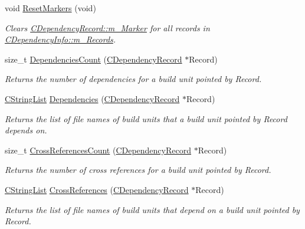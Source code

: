 \begin{DoxyCompactItemize}
\item 
void \hyperlink{classCDependencyInfo_a437ff774f21c51a187ad9a0b7ffbfa93}{Reset\-Markers} (void)
\begin{DoxyCompactList}\small\item\em Clears \hyperlink{classCDependencyRecord_a0327e854ac8b0bc48eefe3155a84475e}{C\-Dependency\-Record\-::m\-\_\-\-Marker} for all records in \hyperlink{classCDependencyInfo_ad76c0932810b200455ce757da050cda2}{C\-Dependency\-Info\-::m\-\_\-\-Records}. \end{DoxyCompactList}\item 
size\-\_\-t \hyperlink{classCDependencyInfo_a3ce43638906ad7dcc21f4ea8664ab34e}{Dependencies\-Count} (\hyperlink{classCDependencyRecord}{C\-Dependency\-Record} $\ast$Record)
\begin{DoxyCompactList}\small\item\em Returns the number of dependencies for a build unit pointed by {\itshape Record}. \end{DoxyCompactList}\item 
\hyperlink{classCStringList}{C\-String\-List} \hyperlink{classCDependencyInfo_aebc22dfe747ed1208ab4a16a396e7afb}{Dependencies} (\hyperlink{classCDependencyRecord}{C\-Dependency\-Record} $\ast$Record)
\begin{DoxyCompactList}\small\item\em Returns the list of file names of build units that a build unit pointed by {\itshape Record} depends on. \end{DoxyCompactList}\item 
size\-\_\-t \hyperlink{classCDependencyInfo_a2f6a15907c7ccb90c9dc1466d565241f}{Cross\-References\-Count} (\hyperlink{classCDependencyRecord}{C\-Dependency\-Record} $\ast$Record)
\begin{DoxyCompactList}\small\item\em Returns the number of cross references for a build unit pointed by {\itshape Record}. \end{DoxyCompactList}\item 
\hyperlink{classCStringList}{C\-String\-List} \hyperlink{classCDependencyInfo_ab93f959d3c0430039430a73562080b90}{Cross\-References} (\hyperlink{classCDependencyRecord}{C\-Dependency\-Record} $\ast$Record)
\begin{DoxyCompactList}\small\item\em Returns the list of file names of build units that depend on a build unit pointed by {\itshape Record}. \end{DoxyCompactList}\end{DoxyCompactItemize}
